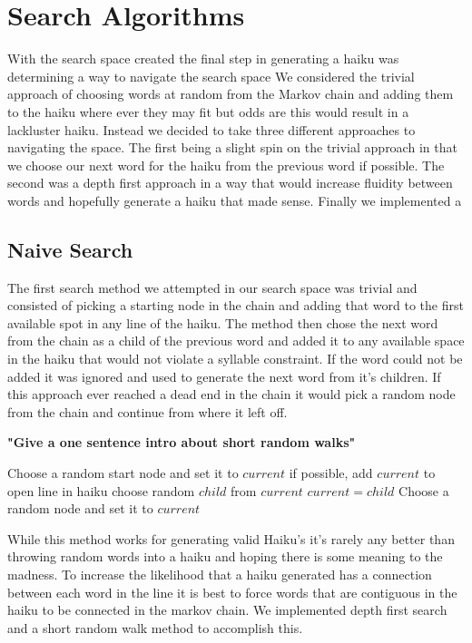 \documentclass[]{article}
\newcommand{\comment}[1]
{\par {\bfseries \color{green} #1 \par}}
\begin{document}
\section{Search Algorithms}
With the search space created the final step in generating a haiku was determining a way to navigate the search space We considered the trivial approach of choosing words at random from the Markov chain and adding them to the haiku where ever they may fit but odds are this would result in a lackluster haiku. Instead we decided to take three different approaches to navigating the space. The first being a slight spin on the trivial approach in that we choose our next word for the haiku from the previous word if possible. The second was a depth first approach in a way that would increase fluidity between words and hopefully generate a haiku that made sense. Finally we implemented a 

\subsection{Naive Search}
The first search method we attempted in our search space was trivial and consisted of picking a starting node in the chain and adding that word to the first available spot in any line of the haiku. The method then chose the next word from the chain as a child of the previous word and added it to any available space in the haiku that would not violate a syllable constraint. If the word could not be added it was ignored and used to generate the next word from it's children. If this approach ever reached a dead end in the chain it would pick a random node from the chain and continue from where it left off.\comment{"Give a one sentence intro about short random walks"}

\begin{algorithm}[H]
	\caption{$Naive\_Search()$} \label{Naive}
	\begin{algorithmic}[1]
		\State Choose a random start node and set it to $current$
			\State if possible, add $current$ to open line in haiku
				\State choose random $child$ from $current$
				\State $current = child$
			\Else
				\State Choose a random node and set it to $current$
			\EndIf
		\EndWhile
	\end{algorithmic}
\end{algorithm}

While this method works for generating valid Haiku's it's rarely any better than throwing random words into a haiku and hoping there is some meaning to the madness. To increase the likelihood that a haiku generated has a connection between each word in the line it is best to force words that are contiguous in the haiku to be connected in the markov chain. We implemented depth first search and a short random walk method to accomplish this.
\end{document}
